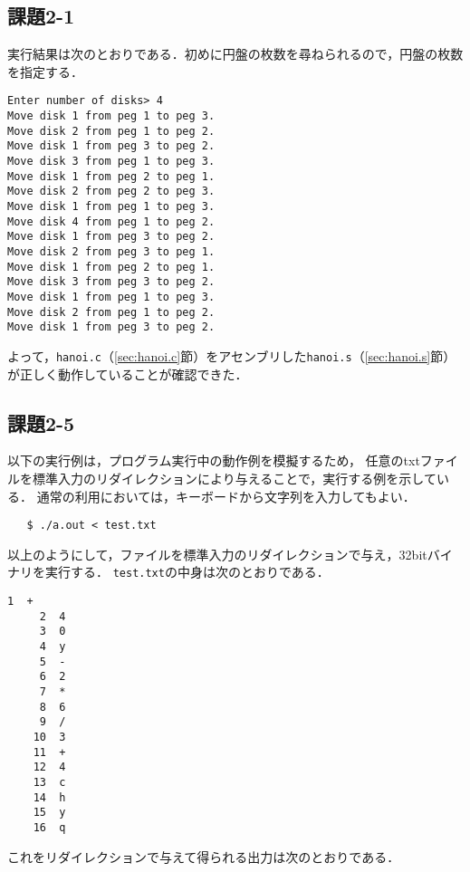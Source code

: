 \subsection{課題2-1}
実行結果は次のとおりである．初めに円盤の枚数を尋ねられるので，円盤の枚数を指定する．

\begin{Verbatim}
Enter number of disks> 4
Move disk 1 from peg 1 to peg 3.
Move disk 2 from peg 1 to peg 2.
Move disk 1 from peg 3 to peg 2.
Move disk 3 from peg 1 to peg 3.
Move disk 1 from peg 2 to peg 1.
Move disk 2 from peg 2 to peg 3.
Move disk 1 from peg 1 to peg 3.
Move disk 4 from peg 1 to peg 2.
Move disk 1 from peg 3 to peg 2.
Move disk 2 from peg 3 to peg 1.
Move disk 1 from peg 2 to peg 1.
Move disk 3 from peg 3 to peg 2.
Move disk 1 from peg 1 to peg 3.
Move disk 2 from peg 1 to peg 2.
Move disk 1 from peg 3 to peg 2.
\end{Verbatim}

よって，\verb|hanoi.c|（\ref{sec:hanoi.c}節）をアセンブリした\verb|hanoi.s|（\ref{sec:hanoi.s}節）が正しく動作していることが確認できた．

\subsection{課題2-5}
以下の実行例は，プログラム実行中の動作例を模擬するため，
任意のtxtファイルを標準入力のリダイレクションにより与えることで，実行する例を示している．
通常の利用においては，キーボードから文字列を入力してもよい．

{\fontsize{10pt}{11pt} \selectfont
 \begin{verbatim}
   $ ./a.out < test.txt
 \end{verbatim}
}

以上のようにして，ファイルを標準入力のリダイレクションで与え，32bitバイナリを実行する．
\verb|test.txt|の中身は次のとおりである．
\begin{Verbatim}[fontsize=\small, baselinestretch=0.8]
     1	+
     2	4
     3	0
     4	y
     5	-
     6	2
     7	*
     8	6
     9	/
    10	3
    11	+
    12	4
    13	c
    14	h
    15	y
    16	q
\end{Verbatim}

これをリダイレクションで与えて得られる出力は次のとおりである．

